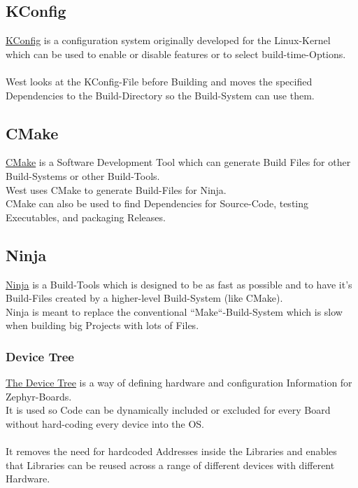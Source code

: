 \pagebreak

\subsection{KConfig}

\href{https://www.kernel.org/doc/html/latest/kbuild/kconfig-language.html}
{KConfig} is a configuration system originally developed for the Linux-Kernel
which can be used to enable or disable features or to select build-time-Options.
\\
\\
West looks at the KConfig-File before Building and moves the specified Dependencies
to the Build-Directory so the Build-System can use them.

\subsection{CMake}

\href{https://cmake.org/}
{CMake} is a Software Development Tool which can generate Build Files for other
Build-Systems or other Build-Tools.
\\
West uses CMake to generate Build-Files for Ninja.
\\
CMake can also be used to find Dependencies for Source-Code, testing Executables,
and packaging Releases.

\subsection{Ninja}

\href{https://ninja-build.org/}{Ninja} is a Build-Tools which is designed to be
as fast as possible and to have it's Build-Files created by a higher-level
Build-System (like CMake).
\\
Ninja is meant to replace the conventional ``Make``-Build-System which is slow
when building big Projects with lots of Files.

\subsubsection{Device Tree}

\href{https://docs.zephyrproject.org/2.0.0/guides/dts/index.html}
{The Device Tree} is a way of defining hardware and configuration
Information for Zephyr-Boards.
\\
It is used so Code can be dynamically included or excluded for
every Board without hard-coding every device into the OS.
\\
\\
It removes the need for hardcoded Addresses inside the Libraries and enables
that Libraries can be reused across a range of different devices with
different Hardware.

